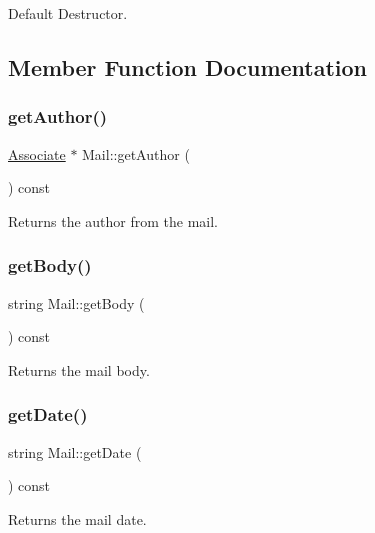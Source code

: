 Default Destructor. 



\subsection{Member Function Documentation}
\mbox{\label{classMail_a23db9880d8a7d0fed31668b895fc3899}} 
\subsubsection{\texorpdfstring{get\+Author()}{getAuthor()}}
{\footnotesize\ttfamily \mbox{\hyperlink{classAssociate}{Associate}} $\ast$ Mail\+::get\+Author (\begin{DoxyParamCaption}{ }\end{DoxyParamCaption}) const}



Returns the author from the mail. 

\mbox{\label{classMail_af89b1b3d0f3c9d92a272c06f18fbdec3}} 
\subsubsection{\texorpdfstring{get\+Body()}{getBody()}}
{\footnotesize\ttfamily string Mail\+::get\+Body (\begin{DoxyParamCaption}{ }\end{DoxyParamCaption}) const}



Returns the mail body. 

\mbox{\label{classMail_ac45841e601864ec3f84566c3ee77de9a}} 
\subsubsection{\texorpdfstring{get\+Date()}{getDate()}}
{\footnotesize\ttfamily string Mail\+::get\+Date (\begin{DoxyParamCaption}{ }\end{DoxyParamCaption}) const}



Returns the mail date. 


